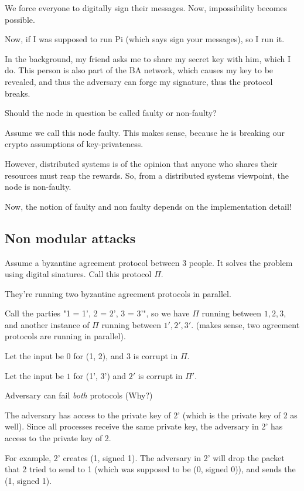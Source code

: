 We force everyone to digitally sign their messages. Now, impossibility becomes
possible.

Now, if I was supposed to run Pi (which says sign your messages), so I run it.


In the background, my friend asks me to share my secret key with him, which I do.
This person is also part of the BA network, which causes my key to be revealed,
and thus the adversary can forge my signature, thus the protocol breaks.


Should the node in question be called faulty or non-faulty?

Assume we call this node faulty. This makes sense, because he is breaking our
crypto assumptions of key-privateness.

However, distributed systems is of the opinion that anyone who shares their
resources must reap the rewards. So, from a distributed systems viewpoint,
the node is non-faulty.

Now, the notion of faulty and non faulty depends on the implementation detail!


\subsection{Non modular attacks}
Assume a byzantine agreement protocol between 3 people. It solves the problem
using digital sinatures. Call this protocol $\Pi$.


They're running two byzantine agreement protocols in parallel.

Call the parties "1 = 1', 2 = 2', 3 = 3'", so we have $\Pi$ running
between $1, 2, 3$, and another instance of $\Pi$ running between
$1', 2', 3'$. (makes sense, two agreement protocols are running in parallel).


Let the input be $0$ for (1, 2), and $3$ is corrupt in $\Pi$.

Let the input be $1$ for (1', 3') and $2'$ is corrupt in $\Pi'$.


Adversary can fail \textit{both} protocols (Why?)

The adversary has access to the private key of 2' (which is the private key
of 2 as well). Since all processes receive the same private key, the adversary
in 2' has access to the private key of 2.

For example, 2' creates (1, signed 1). The adversary in 2' will drop the packet
that 2 tried to send to 1 (which was supposed to be (0, signed 0)),
and sends the (1, signed 1).

